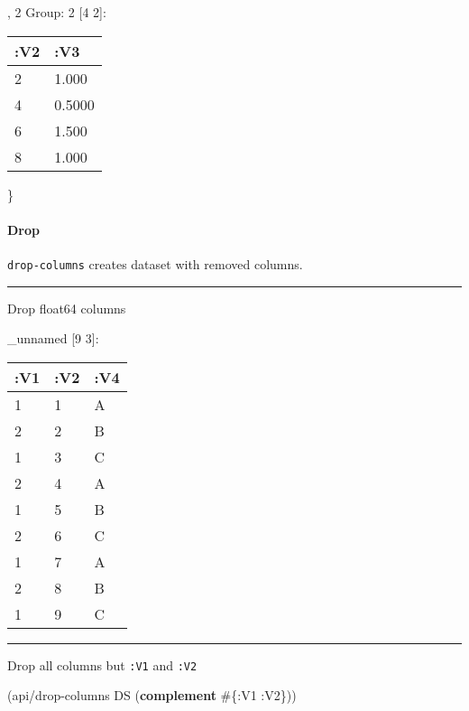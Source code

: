 \documentclass[]{article}
\newenvironment{Shaded}{\begin{snugshade}}{\end{snugshade}}
\newcommand{\KeywordTok}[1]{\textcolor[rgb]{0.13,0.29,0.53}{\textbf{#1}}}
\newcommand{\VariableTok}[1]{\textcolor[rgb]{0.00,0.00,0.00}{#1}}
\newcommand{\AttributeTok}[1]{\textcolor[rgb]{0.77,0.63,0.00}{#1}}
\newcommand{\NormalTok}[1]{#1}
\let\oldparagraph\paragraph
\renewcommand{\paragraph}[1]{\oldparagraph{#1}\mbox{}}
\begin{document}
, 2 Group: 2 {[}4 2{]}:

\begin{longtable}[]{@{}ll@{}}
\toprule
:V2 & :V3\tabularnewline
\midrule
\endhead
2 & 1.000\tabularnewline
4 & 0.5000\tabularnewline
6 & 1.500\tabularnewline
8 & 1.000\tabularnewline
\bottomrule
\end{longtable}

\}

\paragraph{Drop}\label{drop}

\texttt{drop-columns} creates dataset with removed columns.

\begin{center}\rule{0.5\linewidth}{0.5pt}\end{center}

Drop float64 columns

\begin{Shaded}
\end{Shaded}

\_unnamed {[}9 3{]}:

\begin{longtable}[]{@{}lll@{}}
\toprule
:V1 & :V2 & :V4\tabularnewline
\midrule
\endhead
1 & 1 & A\tabularnewline
2 & 2 & B\tabularnewline
1 & 3 & C\tabularnewline
2 & 4 & A\tabularnewline
1 & 5 & B\tabularnewline
2 & 6 & C\tabularnewline
1 & 7 & A\tabularnewline
2 & 8 & B\tabularnewline
1 & 9 & C\tabularnewline
\bottomrule
\end{longtable}

\begin{center}\rule{0.5\linewidth}{0.5pt}\end{center}

Drop all columns but \texttt{:V1} and \texttt{:V2}

\begin{Shaded}
\begin{Highlighting}[]
\NormalTok{(api/drop-columns DS (}\KeywordTok{complement}\NormalTok{ #\{}\AttributeTok{:V1} \AttributeTok{:V2}\NormalTok{\}))}
\end{Highlighting}
\end{Shaded}
\end{document}
